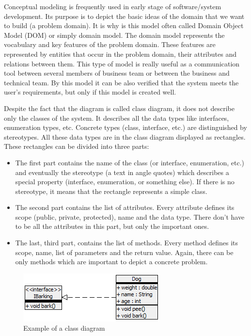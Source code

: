 Conceptual modeling is frequently used in early stage of software/system development. Its purpose is to depict the basic ideas of the domain that we want to build (a problem domain). It is why is this model often called Domain Object Model (DOM) or simply domain model. The domain model represents the vocabulary and key features of the problem domain. These features are represented by entities that occur in the problem domain, their attributes and relations between them. This type of model is really useful as a communication tool between several members of business team or between the business and technical team. By this model it can be also verified that the system meets the user's requirements, but only if this model is created well.

Despite the fact that the diagram is called class diagram, it does not describe only the classes of the system. It describes all the data types like interfaces, enumeration types, etc. Concrete types (class, interface, etc.) are distinguished by stereotypes. All these data types are in the class diagram displayed as rectangles. These rectangles can be divided into three parts: 
\begin{itemize}
    \item The first part contains the name of the class (or interface, enumeration, etc.) and eventually the stereotype (a text in \guillemotleft angle quotes\guillemotright) which describes a special property (interface, enumeration, or something else). If there is no stereotype, it means that the rectangle represents a simple class.
    \item The second part contains the list of attributes. Every attribute defines its scope (public, private, protected), name and the data type. There don't have to be all the attributes in this part, but only the important ones.
    \item The last, third part, contains the list of methods. Every method defines its scope, name, list of parameters and the return value. Again, there can be only methods which are important to depict a concrete problem.
\end{itemize}

\begin{figure}[!ht]
\begin{center}
\includegraphics[]{img/classDiagramExample.png}
\caption{Example of a class diagram}
\label{f-classDiagramExample}
\end{center}
\end{figure}

